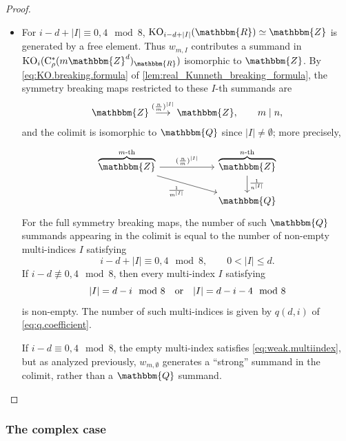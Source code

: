 \documentclass{amsart}
\numberwithin{figure}{section}
\numberwithin{equation}{section}
\numberwithin{table}{section}
\theoremstyle{plain}
\theoremstyle{definition}
\theoremstyle{remark}
\theoremstyle{nonumber}
\newcommand{\Z}{\mathbb{Z}}
\newcommand{\Q}{\mathbb{Q}}
\newcommand{\R}{\mathbb{R}}
\newcommand{\KO}{\relax\ifmmode\operatorname{KO}\else\textup{KO}\fi}
\newcommand{\Cst}{\relax\ifmmode\mathrm{C}^*\else\textup{C*}\fi}
\newcommand{\Cstr}{\Cst_\rho} %
\renewcommand{\mathbb}{\mathbbm} %
\DeclarePairedDelimiter{\abs}{\lvert}{\rvert} %
\begin{document}
\begin{proof}
\begin{itemize}
\item 
For \( i-d+|I|\equiv 0,4\mod 8 \), \( \KO_{i-d+|I|}(\R)\simeq\Z \) is
generated by a free element. Thus $w_{m,I}$ contributes a summand in \(
\KO_i(\Cstr(m\Z^d)_{\R}) \) isomorphic to \( \Z \). By \eqref{eq:KO.breaking.formula} of \cref{lem:real_Kunneth_breaking_formula}, the symmetry breaking maps restricted to these $I$-th summands are
\[
\Z\overset{(\frac{n}{m})^{|I|}}\longrightarrow\Z,\qquad m\mid n,
\]
and the colimit is isomorphic to $\Q$ since $|I|\neq \emptyset$; more
precisely,
\begin{equation}\label{eq:basic_mult_colimit}
\begin{tikzcd}[column sep=2cm]
\overbrace{\Z}^{m\text{-th}}\ar[r,"(\frac{n}{m})^{|I|}"]\ar[dr,"\frac{1}{m^{|I|}}"'] & \overbrace{\Z}^{n\text{-th}}\ar[d,"\frac{1}{n^{|I|}}"] \\
& \Q
\end{tikzcd}
\end{equation}
For the full symmetry breaking maps, the number of such $\Q$ summands
appearing in the colimit is equal to the number of non-empty 
multi-indices $I$ satisfying
\[
i-d+|I|\equiv 0,4\mod 8,\qquad 0<|I|\leq d.
\]
If \( i-d\not\equiv0,4\mod 8 \), then every multi-index \( I \) satisfying
\begin{equation}\label{eq:weak.multiindex}
  \abs{I}=d-i\mod 8\quad\text{or}\quad\abs{I}=d-i-4\mod 8
\end{equation}
is non-empty. The number of such multi-indices is given by $q(d,i)$ of
\eqref{eq:q.coefficient}.

If \( i-d\equiv 0,4\mod 8 \), the empty multi-index satisfies
\eqref{eq:weak.multiindex}, but as analyzed previously, $w_{m,\emptyset}$ generates a ``strong''
summand in the colimit, rather than a $\Q$ summand. \qedhere
\end{itemize}
\end{proof}


\subsubsection{The complex case}
\label{sec:complex_d-dim}
\end{document}
